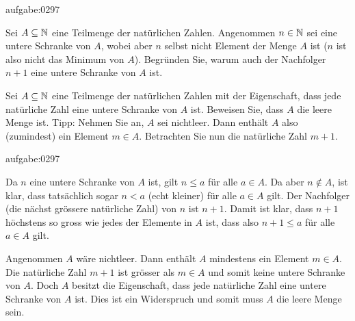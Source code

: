 \begin{aufgabe}{aufgabe:0297}
    \begin{aenum}
        \item Sei $A\subseteq\mathbb{N}$ eine Teilmenge der natürlichen Zahlen. Angenommen $n\in\mathbb{N}$ sei eine untere Schranke von $A$, wobei aber $n$ selbst nicht Element der Menge $A$ ist ($n$ ist also nicht das Minimum von $A$). Begründen Sie, warum auch der Nachfolger $n+1$ eine untere Schranke von $A$ ist.
        \item Sei $A\subseteq\mathbb{N}$ eine Teilmenge der natürlichen Zahlen mit der Eigenschaft, dass jede natürliche Zahl eine untere Schranke von $A$ ist. Beweisen Sie, dass $A$ die leere Menge ist. Tipp: Nehmen Sie an, $A$ sei nichtleer. Dann enthält $A$ also (zumindest) ein Element $m\in A$. Betrachten Sie nun die natürliche Zahl $m+1$.
    \end{aenum}
    \end{aufgabe}
    \begin{antwort}{aufgabe:0297}
    \begin{aenum}
        \item Da $n$ eine untere Schranke von $A$ ist, gilt $n\leq a$ für alle $a\in A$. Da aber $n\notin A$, ist klar, dass tatsächlich sogar $n < a$ (echt kleiner) für alle $a\in A$ gilt. Der Nachfolger (die nächst grössere natürliche Zahl) von $n$ ist $n+1$. Damit ist klar, dass $n+1$ höchstens so gross wie jedes der Elemente in $A$ ist, dass also $n+1 \leq a$ für alle $a\in A$ gilt.
        \item Angenommen $A$ wäre nichtleer. Dann enthält $A$ mindestens ein Element $m\in A$. Die natürliche Zahl $m+1$ ist grösser als $m\in A$ und somit keine untere Schranke von $A$. Doch $A$ besitzt die Eigenschaft, dass jede natürliche Zahl eine untere Schranke von $A$ ist. Dies ist ein Widerspruch und somit muss $A$ die leere Menge sein.
    \end{aenum}
\end{antwort}

